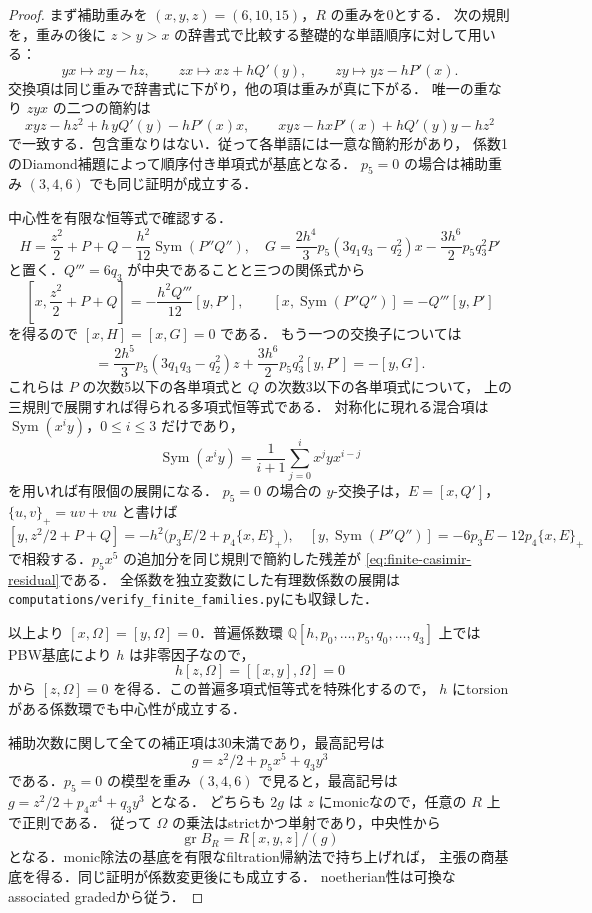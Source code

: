 \begin{proof}
まず補助重みを $(x,y,z)=(6,10,15)$，$R$ の重みを0とする．
次の規則を，重みの後に $z>y>x$ の辞書式で比較する整礎的な単語順序に対して用いる：
\[
 yx\longmapsto xy-hz,\qquad
 zx\longmapsto xz+hQ'(y),\qquad
 zy\longmapsto yz-hP'(x).
\]
交換項は同じ重みで辞書式に下がり，他の項は重みが真に下がる．
唯一の重なり $zyx$ の二つの簡約は
\[
 xyz-hz^2+h\,yQ'(y)-hP'(x)x,
 \qquad
 xyz-hxP'(x)+hQ'(y)y-hz^2
\]
で一致する．包含重なりはない．従って各単語には一意な簡約形があり，
係数1のDiamond補題によって順序付き単項式が基底となる．
$p_5=0$ の場合は補助重み $(3,4,6)$ でも同じ証明が成立する．

中心性を有限な恒等式で確認する．
\[
 H=\frac{z^2}{2}+P+Q-\frac{h^2}{12}\operatorname{Sym}(P''Q''),\quad
 G=\frac{2h^4}{3}p_5(3q_1q_3-q_2^2)x
       -\frac{3h^6}{2}p_5q_3^2P'
\]
と置く．$Q'''=6q_3$ が中央であることと三つの関係式から
\[
 \left[x,\frac{z^2}{2}+P+Q\right]
       =-\frac{h^2Q'''}{12}[y,P'],\qquad
 [x,\operatorname{Sym}(P''Q'')]=-Q'''[y,P']
\]
を得るので $[x,H]=[x,G]=0$ である．
もう一つの交換子については
\begin{equation}
 [y,H]=\frac{2h^5}{3}p_5(3q_1q_3-q_2^2)z
          +\frac{3h^6}{2}p_5q_3^2[y,P']=-[y,G].
 \label{eq:finite-casimir-residual}
\end{equation}
これらは $P$ の次数5以下の各単項式と $Q$ の次数3以下の各単項式について，
上の三規則で展開すれば得られる多項式恒等式である．
対称化に現れる混合項は $\operatorname{Sym}(x^i y)$，$0\le i\le3$ だけであり，
\[
 \operatorname{Sym}(x^i y)=\frac{1}{i+1}\sum_{j=0}^{i}x^j yx^{i-j}
\]
を用いれば有限個の展開になる．
$p_5=0$ の場合の $y$-交換子は，$E=[x,Q']$，$\{u,v\}_+=uv+vu$ と書けば
\[
 [y,z^2/2+P+Q]=-h^2\bigl(p_3E/2+p_4\{x,E\}_+\bigr),
 \quad
 [y,\operatorname{Sym}(P''Q'')]=-6p_3E-12p_4\{x,E\}_+
\]
で相殺する．$p_5x^5$ の追加分を同じ規則で簡約した残差が
\eqref{eq:finite-casimir-residual}である．
全係数を独立変数にした有理数係数の展開は
\texttt{computations/verify\_finite\_families.py}にも収録した．

以上より $[x,\Omega]=[y,\Omega]=0$．普遍係数環
$\mathbb Q[h,p_0,\ldots,p_5,q_0,\ldots,q_3]$ 上ではPBW基底により $h$ は非零因子なので，
\[
 h[z,\Omega]=[[x,y],\Omega]=0
\]
から $[z,\Omega]=0$ を得る．この普遍多項式恒等式を特殊化するので，
$h$ にtorsionがある係数環でも中心性が成立する．

補助次数に関して全ての補正項は30未満であり，最高記号は
\[
 g=z^2/2+p_5x^5+q_3y^3
\]
である．$p_5=0$ の模型を重み $(3,4,6)$ で見ると，最高記号は
$g=z^2/2+p_4x^4+q_3y^3$ となる．
どちらも $2g$ は $z$ にmonicなので，任意の $R$ 上で正則である．
従って $\Omega$ の乗法はstrictかつ単射であり，中央性から
\[
 \operatorname{gr}B_R=R[x,y,z]/(g)
\]
となる．monic除法の基底を有限なfiltration帰納法で持ち上げれば，
主張の商基底を得る．同じ証明が係数変更後にも成立する．
noetherian性は可換なassociated gradedから従う．
\end{proof}

